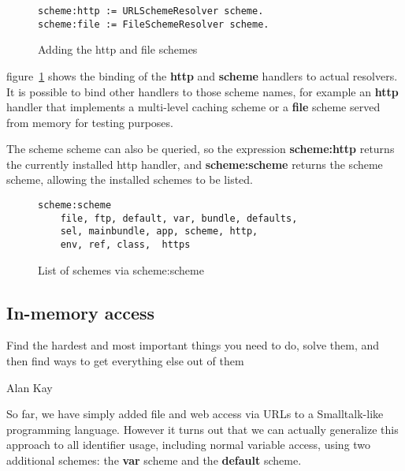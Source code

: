 \documentclass[preprint,authoryear]{acm_proc_article-sp}
\begin{document}
\begin{figure}[htbp]
\begin{center}
\begin{small}
\begin{verbatim}
scheme:http := URLSchemeResolver scheme.
scheme:file := FileSchemeResolver scheme.
\end{verbatim}
\end{small}
\caption{Adding the http and file schemes}
\label{scheme-scheme-http}
\end{center}
\end{figure}

figure~\ref{scheme-scheme-http} shows the binding of the {\bf http} and {\bf scheme}
handlers to actual resolvers.  It is possible to bind other handlers to those scheme
names, for example an {\bf http} handler that implements a multi-level caching scheme
or a {\bf file} scheme served from memory for testing purposes.


The scheme scheme can also be queried,
so the expression {\bf scheme:http} returns the currently installed http handler, and 
{\bf scheme:scheme} returns the scheme scheme, allowing the installed schemes to
be listed.

\begin{figure}[htbp]
\begin{center}
\begin{small}
\begin{verbatim}
scheme:scheme
    file, ftp, default, var, bundle, defaults, 
    sel, mainbundle, app, scheme, http,
    env, ref, class,  https
\end{verbatim}
\end{small}
\caption{List of schemes via scheme:scheme}
\label{scheme-scheme}
\end{center}
\end{figure}

\subsection{In-memory access}


\epigraph{Find the hardest and most important things you need to do,
solve them, and then find ways to get everything else out of them}{Alan Kay}

So far, we have simply added file and web access via URLs to a 
Smalltalk-like programming language.  However it turns out that we can actually generalize
this approach to all identifier usage, including normal variable access, using
two additional schemes:  the {\bf var} scheme and the {\bf default} scheme.
\end{document}
